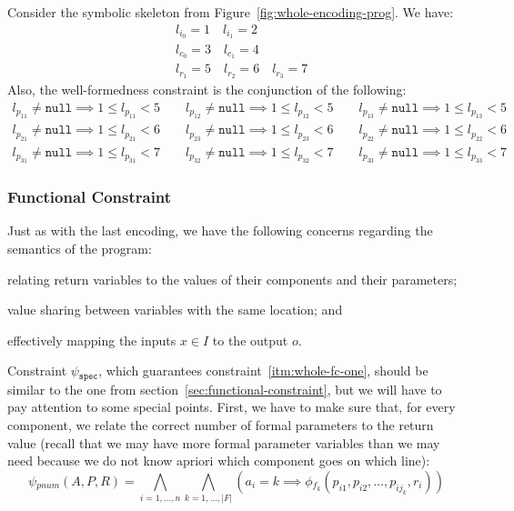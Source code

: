 \begin{example}
  Consider the symbolic skeleton from Figure~\ref{fig:whole-encoding-prog}.
  We have:
  \begin{align*}
    &l_{i_0} = 1 \quad l_{i_1} = 2 \\
    &l_{c_0} = 3 \quad l_{c_1} = 4 \\
    &l_{r_1} = 5 \quad l_{r_2} = 6 \quad l_{r_3} = 7
  \end{align*}
  Also, the well-formedness constraint is the conjunction of the following:
  \begin{align*}
           l_{p_{11}} \neq \mathtt{null} \implies 1 \leq l_{p_{11}} < 5
    \qquad l_{p_{12}} \neq \mathtt{null} \implies 1 \leq l_{p_{12}} < 5
    \qquad l_{p_{13}} \neq \mathtt{null} \implies 1 \leq l_{p_{13}} < 5 \\
           l_{p_{21}} \neq \mathtt{null} \implies 1 \leq l_{p_{21}} < 6
    \qquad l_{p_{23}} \neq \mathtt{null} \implies 1 \leq l_{p_{23}} < 6
    \qquad l_{p_{22}} \neq \mathtt{null} \implies 1 \leq l_{p_{22}} < 6 \\
           l_{p_{31}} \neq \mathtt{null} \implies 1 \leq l_{p_{31}} < 7
    \qquad l_{p_{32}} \neq \mathtt{null} \implies 1 \leq l_{p_{32}} < 7
    \qquad l_{p_{33}} \neq \mathtt{null} \implies 1 \leq l_{p_{33}} < 7
  \end{align*}
\end{example}
%
\subsubsection{Functional Constraint}

Just as with the last encoding, we have the following concerns regarding the
semantics of the program:
\begin{enumerate*}[(1)]
\item \label{itm:whole-fc-one} relating return variables to the values of their
components and their parameters;
\item \label{itm:whole-fc-two} value sharing between variables with the same
location; and
\item \label{itm:whole-fc-three} effectively mapping the inputs $x \in I$ to the
output $o$.
\end{enumerate*}

Constraint $\psi{}_{\mathtt{spec}}$, which guarantees
constraint~\ref{itm:whole-fc-one}, should be similar to the one from
section~\ref{sec:functional-constraint}, but we will have to pay attention to
some special points.
First, we have to make sure that, for every component, we relate the correct
number of formal parameters to the return value (recall that we may have more
formal parameter variables than we may need because we do not know apriori which
component goes on which line):
%
\[
  \psi{}_{pnum}(A, P, R) =
  \bigwedge_{i=1,\ldots,n}\bigwedge_{k=1,\ldots,|F|}
  (a_i = k \implies \phi{}_{f_{k}}(p_{i1}, p_{i2}, \ldots, p_{ij_k}, r_i))
\]

